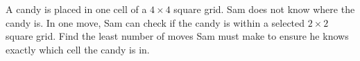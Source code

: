 A candy is placed in one cell of a $4\times 4$ square grid. Sam does not know where the candy is. In one move, Sam can check if the candy is within a selected $2\times 2$ square grid. Find the least number of moves Sam must make to ensure he knows exactly which cell the candy is in.
